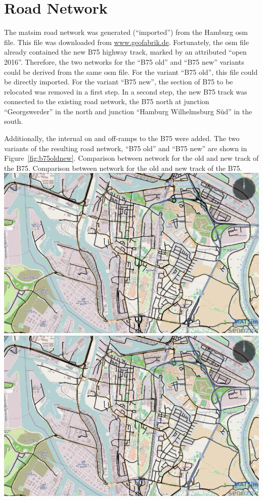 \section{Road Network}
The \gls{matsim} road network was generated (``imported'') from the Hamburg \gls{osm} file. This file was downloaded from \url{www.geofabrik.de}. Fortunately, the \gls{osm} file already contained the new B75 highway track, marked by an attributed ``open 2016''. Therefore, the two networks for the ``B75 old'' and ``B75 new''  variants could be derived from the same \gls{osm} file. For the variant ``B75 old'', this file could be directly imported. For the variant ``B75 new'', the section of B75 to be relocated was removed in a first step. In a second step, the new B75 track was connected to the existing road network, \ie the B75 north at junction ``Georgswerder'' in the north and junction ``Hamburg Wilhelmsburg Süd'' in the south.

Additionally, the internal on and off-ramps to the B75 were added. The two variants of the resulting road network, \ie ``B75 old'' and ``B75 new'' are shown in Figure~\ref{fig:b75oldnew}.
%
\createfigure%
{Comparison between network for the old and new track of the B75.}%
{Comparison between network for the old and new track of the B75.}%
{\label{fig:b75oldnew}}%
{%
  \createsubfigure%
  {}%
  {\includegraphics[width=.475\linewidth]{using/figures/B75old}}%
  {}%
  {}%
  \createsubfigure%
  {}%
  {\includegraphics[width=.475\linewidth]{using/figures/B75new}}
  {}%
  {}%
}%
  {}%

